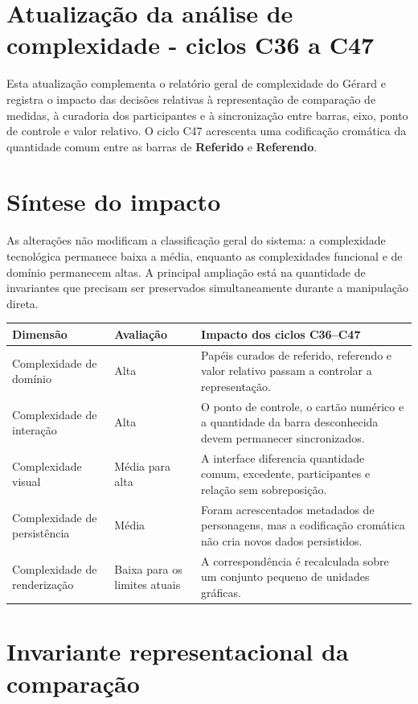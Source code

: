\documentclass[12pt,a4paper]{article}
\begin{document}
\section*{Atualização da análise de complexidade - ciclos C36 a C47}

Esta atualização complementa o relatório geral de complexidade do Gérard e registra o impacto das decisões relativas à representação de comparação de medidas, à curadoria dos participantes e à sincronização entre barras, eixo, ponto de controle e valor relativo. O ciclo C47 acrescenta uma codificação cromática da quantidade comum entre as barras de \textbf{Referido} e \textbf{Referendo}.

\section{Síntese do impacto}

As alterações não modificam a classificação geral do sistema: a complexidade tecnológica permanece baixa a média, enquanto as complexidades funcional e de domínio permanecem altas. A principal ampliação está na quantidade de invariantes que precisam ser preservados simultaneamente durante a manipulação direta.

\begin{tabularx}{\textwidth}{p{3.7cm}p{2.7cm}X}
\toprule
\textbf{Dimensão} & \textbf{Avaliação} & \textbf{Impacto dos ciclos C36--C47}\\
\midrule
Complexidade de domínio & Alta & Papéis curados de referido, referendo e valor relativo passam a controlar a representação.\\
Complexidade de interação & Alta & O ponto de controle, o cartão numérico e a quantidade da barra desconhecida devem permanecer sincronizados.\\
Complexidade visual & Média para alta & A interface diferencia quantidade comum, excedente, participantes e relação sem sobreposição.\\
Complexidade de persistência & Média & Foram acrescentados metadados de personagens, mas a codificação cromática não cria novos dados persistidos.\\
Complexidade de renderização & Baixa para os limites atuais & A correspondência é recalculada sobre um conjunto pequeno de unidades gráficas.\\
\bottomrule
\end{tabularx}

\section{Invariante representacional da comparação}
\end{document}
